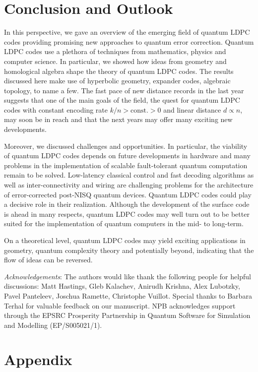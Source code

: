 \documentclass[amsmath, amssymb, floatfix, reprint, twocolumn, notitlepage, 10pt]{revtex4-1}
\begin{document}
\section{Conclusion and Outlook}
In this perspective, we gave an overview of the emerging field of quantum LDPC codes providing promising new approaches to quantum error correction.
Quantum LDPC codes use a plethora of techniques from mathematics, physics and computer science.
In particular, we showed how ideas from geometry and homological algebra shape the theory of quantum LDPC codes. 
The results discussed here make use of hyperbolic geometry, expander codes, algebraic topology, to name a few.  
The fast pace of new distance records in the last year suggests that one of the main goals of the field, the quest for quantum LDPC codes with constant encoding rate $k/n > \text{const.} > 0$ and linear distance $d \propto n$, may soon be in reach and that the next years may offer many exciting new developments.

Moreover, we discussed challenges and opportunities. 
In particular, the viability of quantum LDPC codes depends on future developments in hardware and
many problems in the implementation of scalable fault-tolerant quantum computation remain to be solved.
Low-latency classical control and fast decoding algorithms as well as inter-connectivity and wiring are challenging problems for the architecture of error-corrected post-NISQ quantum devices.
Quantum LDPC codes could play a decisive role in their realization.
Although the development of the surface code is ahead in many respects, quantum LDPC codes may well turn out to be better suited for the implementation of quantum computers in the mid- to long-term.

On a theoretical level, quantum LDPC codes may yield exciting applications in geometry, quantum complexity theory and potentially beyond, indicating that the flow of ideas can be reversed.


\vspace{1cm}
\emph{Acknowledgements}:
The authors would like thank the following people for helpful discussions: Matt Hastings, Gleb Kalachev, Anirudh Krishna, Alex Lubotzky, Pavel Panteleev, Joschua Ramette, Christophe Vuillot.
Special thanks to Barbara Terhal for valuable feedback on our manuscript.
NPB acknowledges support through the EPSRC Prosperity Partnership in Quantum Software for Simulation and Modelling (EP/S005021/1).


\section*{Appendix}
\end{document}
